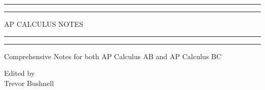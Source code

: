 \documentclass{package/notes}
\begin{document}
	\begin{titlepage} %
		
		\centering %
		
		\scshape %
		
		\vspace*{\baselineskip} %
		
		
		\rule{\textwidth}{1.6pt}\vspace*{-\baselineskip}\vspace*{2pt} %
		\rule{\textwidth}{0.4pt} %
		
		\vspace{0.75\baselineskip} %
		
		{\huge AP CALCULUS NOTES\\} %
		
		\vspace{0.75\baselineskip} %
		
		\rule{\textwidth}{0.4pt}\vspace*{-\baselineskip}\vspace{3.2pt} %
		\rule{\textwidth}{1.6pt} %
		
		\vspace{2\baselineskip} %
		
		
		\LARGE{Comprehensive Notes for both AP Calculus AB and AP Calculus BC} 
		
		\vspace*{3\baselineskip} %
		
		
		
		\vspace{0.5\baselineskip} 
		
		
		
		\vspace{0.5\baselineskip} 
		
		
		
		\vfill 
		
		
		
		\vspace{0.3\baselineskip} 
		
		
		{\large Edited by\\  Trevor Bushnell } 
		
	\end{titlepage}
	\tableofcontents
\end{document}
